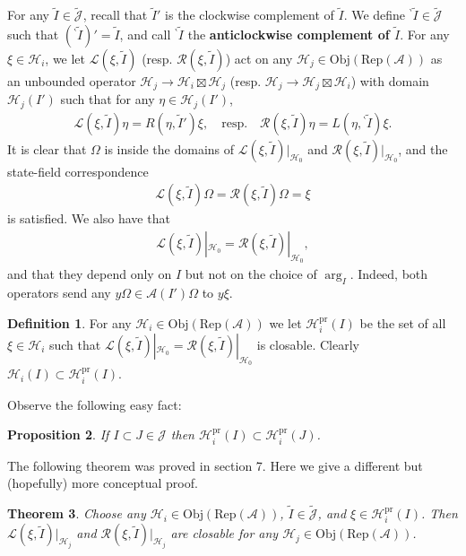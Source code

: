 \documentclass[11pt,b5paper,notitlepage]{article}
\theoremstyle{definition}
\newtheorem{df}{Definition}[subsection]
\theoremstyle{plain}
\newtheorem{thm}[df]{Theorem}
\newtheorem{pp}[df]{Proposition}
\newcommand{\mc}{\mathcal}
\newcommand{\wtd}{\widetilde}
\newcommand{\scr}{\mathscr}
\newcommand{\Jtd}{\widetilde{\mathcal J}}
\newcommand{\RepA}{\mathrm{Rep}(\mc A)}
\newcommand{\Obj}{\mathrm{Obj}}
\newcommand{\bpr}{{}^\backprime}
\newcommand{\pr}{\mathrm{pr}}
\numberwithin{equation}{subsection}
\begin{document}
For any $\wtd I\in\Jtd$, recall that $\wtd I'$ is the clockwise complement of $\wtd I$. We define ${\bpr\wtd I}\in\Jtd$ such that $(\bpr\wtd I)'=\wtd I$, and call ${\bpr\wtd I}$ the \textbf{anticlockwise complement of $\wtd I$}.  For any $\xi\in\mc H_i$, we let $\scr L(\xi,\wtd I)$ (resp. $\scr R(\xi,\wtd I)$) act on any $\mc H_j\in\Obj(\RepA)$ as an unbounded operator $\mc H_j\rightarrow\mc H_i\boxtimes\mc H_j$ (resp. $\mc H_j\rightarrow\mc H_j\boxtimes\mc H_i$) with domain $\mc H_j(I')$ such that for any $\eta\in\mc H_j(I')$,
\begin{align}
\scr L(\xi,\wtd I)\eta=R(\eta,\wtd I')\xi,\quad \text{resp.}  \quad \scr R(\xi,\wtd I)\eta=L(\eta,\bpr\wtd I)\xi.\label{eq7}
\end{align}
It is clear that $\Omega$ is inside the domains of $\scr L(\xi,\wtd I)|_{\mc H_0}$ and $\scr R(\xi,\wtd I)|_{\mc H_0}$, and the state-field correspondence
\begin{align}
\scr L(\xi,\wtd I)\Omega=\scr R(\xi,\wtd I)\Omega=\xi
\end{align}
is satisfied. We also have that
\begin{align}
\scr L(\xi,\wtd I)|_{\mc H_0}=\scr R(\xi,\wtd I)|_{\mc H_0},
\end{align}
and that they depend only on $I$ but not on the choice of $\arg_I$. Indeed, both operators send any $y\Omega\in\mc A(I')\Omega$ to $y\xi$.

\begin{df}
For any $\mc H_i\in\Obj(\RepA)$ we let $\mc H_i^\pr(I)$ \index{Hi@$\mc H_i^\pr(I)$} be the set of all $\xi\in\mc H_i$ such that $\scr L(\xi,\wtd I)|_{\mc H_0}=\scr R(\xi,\wtd I)|_{\mc H_0}$ is closable. Clearly $\mc H_i(I)\subset\mc H_i^\pr(I)$.
\end{df}
 

Observe the following easy fact:

\begin{pp}
	If $I\subset J\in\mc J$ then $\mc H_i^\pr(I)\subset\mc H_i^\pr(J)$.
\end{pp}

The following theorem was proved in \cite{Gui21b} section 7. Here we give a different but (hopefully) more conceptual proof.

\begin{thm}\label{lb12}
Choose any $\mc H_i\in\Obj(\RepA)$, $\wtd I\in\Jtd$, and $\xi\in\mc H_i^\pr(I)$. Then $\scr L(\xi,\wtd I)|_{\mc H_j}$ and $\scr R(\xi,\wtd I)|_{\mc H_j}$ are closable for any $\mc H_j\in\Obj(\RepA)$.
\end{thm}
\end{document}
